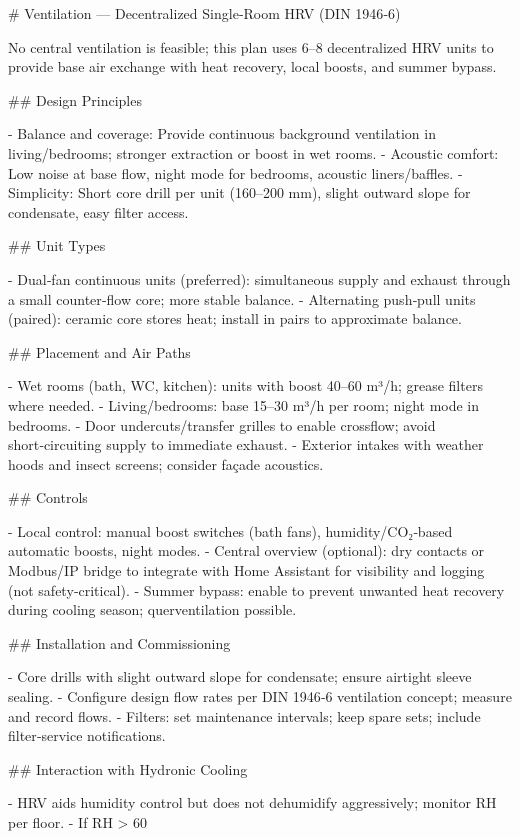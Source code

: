 \documentclass[11pt,oneside]{report}
\begin{document}
\begin{markdown}
# Ventilation — Decentralized Single‑Room HRV (DIN 1946‑6)

No central ventilation is feasible; this plan uses 6–8 decentralized HRV units to provide base air exchange with heat recovery, local boosts, and summer bypass.

## Design Principles

- Balance and coverage: Provide continuous background ventilation in living/bedrooms; stronger extraction or boost in wet rooms.
- Acoustic comfort: Low noise at base flow, night mode for bedrooms, acoustic liners/baffles.
- Simplicity: Short core drill per unit (160–200 mm), slight outward slope for condensate, easy filter access.

## Unit Types

- Dual‑fan continuous units (preferred): simultaneous supply and exhaust through a small counter‑flow core; more stable balance.
- Alternating push‑pull units (paired): ceramic core stores heat; install in pairs to approximate balance.

## Placement and Air Paths

- Wet rooms (bath, WC, kitchen): units with boost 40–60 m³/h; grease filters where needed.
- Living/bedrooms: base 15–30 m³/h per room; night mode in bedrooms.
- Door undercuts/transfer grilles to enable crossflow; avoid short‑circuiting supply to immediate exhaust.
- Exterior intakes with weather hoods and insect screens; consider façade acoustics.

## Controls

- Local control: manual boost switches (bath fans), humidity/CO₂‑based automatic boosts, night modes.
- Central overview (optional): dry contacts or Modbus/IP bridge to integrate with Home Assistant for visibility and logging (not safety‑critical).
- Summer bypass: enable to prevent unwanted heat recovery during cooling season; querventilation possible.

## Installation and Commissioning

- Core drills with slight outward slope for condensate; ensure airtight sleeve sealing.
- Configure design flow rates per DIN 1946‑6 ventilation concept; measure and record flows.
- Filters: set maintenance intervals; keep spare sets; include filter‑service notifications.

## Interaction with Hydronic Cooling

- HRV aids humidity control but does not dehumidify aggressively; monitor RH per floor.
- If RH > 60%
\end{markdown}
\end{document}

